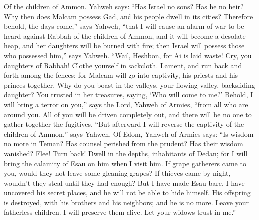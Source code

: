  Of the children of Ammon. Yahweh says: ``Has Israel no
sons? Has he no heir? Why then does Malcam possess Gad, and his people
dwell in its cities?  Therefore behold, the days come,''
says Yahweh, ``that I will cause an alarm of war to be heard against
Rabbah of the children of Ammon, and it will become a desolate heap, and
her daughters will be burned with fire; then Israel will possess those
who possessed him,'' says Yahweh.  ``Wail, Heshbon, for Ai
is laid waste! Cry, you daughters of Rabbah! Clothe yourself in
sackcloth. Lament, and run back and forth among the fences; for Malcam
will go into captivity, his priests and his princes together.
 Why do you boast in the valleys, your flowing valley,
backsliding daughter? You trusted in her treasures, saying, `Who will
come to me?'  Behold, I will bring a terror on you,'' says
the Lord, Yahweh of Armies, ``from all who are around you. All of you
will be driven completely out, and there will be no one to gather
together the fugitives.  ``But afterward I will reverse
the captivity of the children of Ammon,'' says Yahweh.  Of
Edom, Yahweh of Armies says: ``Is wisdom no more in Teman? Has counsel
perished from the prudent? Has their wisdom vanished? 
Flee! Turn back! Dwell in the depths, inhabitants of Dedan; for I will
bring the calamity of Esau on him when I visit him.  If
grape gatherers came to you, would they not leave some gleaning grapes?
If thieves came by night, wouldn't they steal until they had enough?
 But I have made Esau bare, I have uncovered his secret
places, and he will not be able to hide himself. His offspring is
destroyed, with his brothers and his neighbors; and he is no more.
 Leave your fatherless children. I will preserve them
alive. Let your widows trust in me.''

